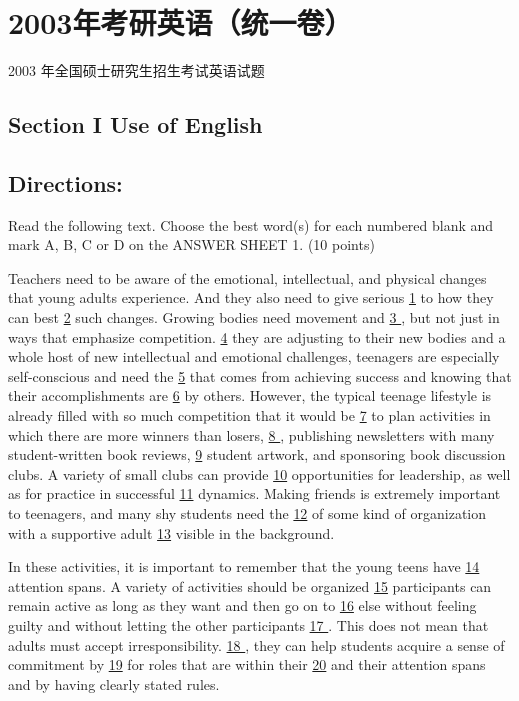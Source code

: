 \documentclass[UTF8,11pt]{ctexart}
\begin{document}
\section*{2003年考研英语（统一卷）}
2003 年全国硕士研究生招生考试英语试题


\subsection*{\textbf{Section I Use of English}}


\subsection*{\textbf{Directions:}}


Read the following text. Choose the best word(s) for each numbered blank and mark A, B, C or D on the ANSWER SHEET 1. (10 points)


Teachers need to be aware of the emotional, intellectual, and physical changes that young adults experience. And they also need to give serious \uline{1} to how they can best \uline{2} such changes. Growing bodies need movement and \uline{3 }, but not just in ways that emphasize competition. \uline{4} they are adjusting to their new bodies and a whole host of new intellectual and emotional challenges, teenagers are especially self-conscious and need the \uline{5} that comes from achieving success and knowing that their accomplishments are \uline{6} by others. However, the typical teenage lifestyle is already filled with so much competition that it would be \uline{7} to plan activities in which there are more winners than losers, \uline{8 }, publishing newsletters with many student-written book reviews, \uline{9} student artwork, and sponsoring book discussion clubs. A variety of small clubs can provide \uline{10} opportunities for leadership, as well as for practice in successful \uline{11} dynamics. Making friends is extremely important to teenagers, and many shy students need the \uline{12} of some kind of organization with a supportive adult \uline{13} visible in the background.


In these activities, it is important to remember that the young teens have \uline{14} attention spans. A variety of activities should be organized \uline{15} participants can remain active as long as they want and then go on to \uline{16} else without feeling guilty and without letting the other participants \uline{17 }. This does not mean that adults must accept irresponsibility. \uline{18 }, they can help students acquire a sense of commitment by \uline{19} for roles that are within their \uline{20} and their attention spans and by having clearly stated rules.
\end{document}

